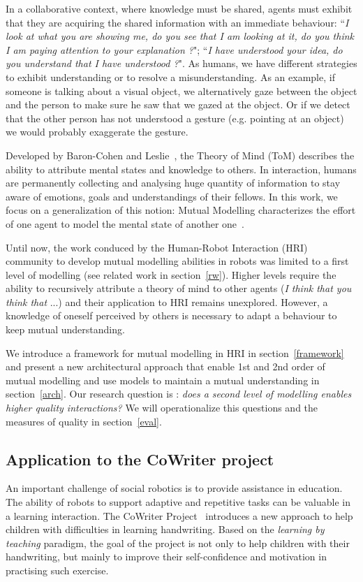 \documentclass[10pt,a4paper]{article}
\begin{document}
In a collaborative context, where knowledge must be shared, agents must exhibit that they are acquiring the shared information with an immediate behaviour: ``\textit{I look at what you are showing me, do you see that I am looking at it, do you think I am paying attention to your explanation ?}"; ``\textit{I have understood your idea, do you understand that I have understood ?}". 
As humans, we have different strategies to exhibit understanding or to resolve a misunderstanding. 
As an example, if someone is talking about a visual object, we alternatively gaze between the object and the person to make sure he saw that we gazed at the object. Or if we detect that the other person has not understood a gesture (e.g. pointing at an object) we would probably exaggerate the gesture.

Developed by Baron-Cohen and Leslie~\cite{baron1985does}, the Theory of Mind (ToM) describes the ability to attribute mental states and knowledge to others. In interaction, humans are permanently collecting and analysing huge quantity of information to stay aware of emotions, goals and understandings of their fellows. In this work, we focus on a generalization of this notion: Mutual Modelling characterizes the effort of one agent to model the mental state of another one~\cite{dillenbourg1999you}. 

Until now, the work conduced by the Human-Robot Interaction (HRI) community to develop mutual modelling abilities in robots was limited to a first level of modelling (see related work in section~\ref{rw}). Higher levels require the ability to recursively attribute a theory of mind to other agents (\textit{I think that you think that} ...) and their application to HRI remains unexplored. However, a knowledge of oneself perceived by others is necessary to adapt a behaviour to keep mutual understanding. 

We introduce a framework for mutual modelling in HRI in section~\ref{framework} and present a new architectural approach that enable 1st and 2nd order of mutual modelling and use models to maintain a mutual understanding in section~\ref{arch}.
Our research question is : \textit{does a second level of modelling enables higher quality interactions?} We will operationalize this questions and the measures of quality in section~\ref{eval}.

\subsection{Application to the CoWriter project}
An important challenge of social robotics is to provide assistance in education. 
The ability of robots to support adaptive and repetitive tasks can be valuable in a learning interaction.
The CoWriter Project~\cite{Hood,jacq2016building} introduces a new approach to help children with difficulties in learning handwriting. 
Based on the \emph{learning by teaching} paradigm, the goal of the project is not only to help children with their handwriting, but mainly to improve their self-confidence and motivation in practising such exercise.
\end{document}
